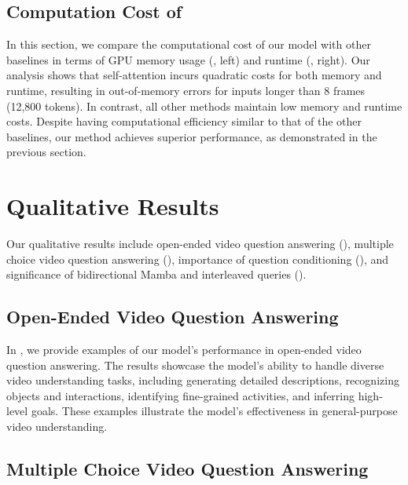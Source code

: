 \subsection{Computation Cost of \modelLlama}



In this section, we compare the computational cost of our model with other baselines in terms of GPU memory usage (, left) and runtime (, right). Our analysis shows that self-attention incurs quadratic costs for both memory and runtime, resulting in out-of-memory errors for inputs longer than 8 frames (12,800 tokens). In contrast, all other methods maintain low memory and runtime costs. Despite having computational efficiency similar to that of the other baselines, our method achieves superior performance, as demonstrated in the previous section. 


\section{Qualitative Results}
\label{sec: qualitative}

Our qualitative results include open-ended video question answering (), multiple choice video question answering (), importance of question conditioning (), and significance of bidirectional Mamba and interleaved queries ().

\subsection{Open-Ended Video Question Answering}
\label{sec:example open-ended}

In , we provide examples of our model's performance in open-ended video question answering. The results showcase the model's ability to handle diverse video understanding tasks, including generating detailed descriptions, recognizing objects and interactions, identifying fine-grained activities, and inferring high-level goals. These examples illustrate the model's effectiveness in general-purpose video understanding.

\subsection{Multiple Choice Video Question Answering}
\label{sec:example multi}

